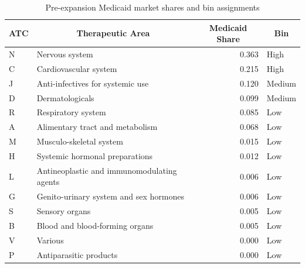 \begin{table}[htbp]
\centering
\caption{Pre-expansion Medicaid market shares and bin assignments}
\label{tab:atc_bins}
\begin{tabular}{llrl}
\toprule
\multicolumn{1}{c}{ATC} & \multicolumn{1}{c}{Therapeutic Area} & \multicolumn{1}{c}{Medicaid Share} & \multicolumn{1}{c}{Bin} \\
\midrule
N & Nervous system                  & 0.363 & High   \\
C & Cardiovascular system           & 0.215 & High   \\
J & Anti-infectives for systemic use & 0.120 & Medium \\
D & Dermatologicals                 & 0.099 & Medium \\
R & Respiratory system              & 0.085 & Low    \\
A & Alimentary tract and metabolism & 0.068 & Low    \\
M & Musculo-skeletal system         & 0.015 & Low    \\
H & Systemic hormonal preparations  & 0.012 & Low    \\
L & Antineoplastic and immunomodulating agents & 0.006 & Low \\
G & Genito-urinary system and sex hormones     & 0.006 & Low \\
S & Sensory organs                  & 0.005 & Low    \\
B & Blood and blood-forming organs  & 0.005 & Low    \\
V & Various                         & 0.000 & Low    \\
P & Antiparasitic products          & 0.000 & Low    \\
\bottomrule
\end{tabular}
\end{table}
